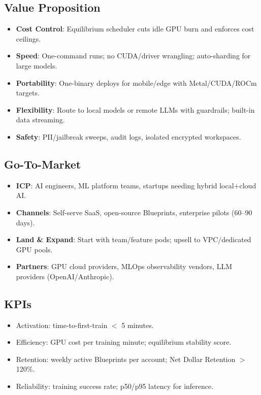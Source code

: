 \documentclass[11pt]{article}
\begin{document}
\subsection{Value Proposition}
\begin{itemize}
  \item \textbf{Cost Control}: Equilibrium scheduler cuts idle GPU burn and enforces cost ceilings.
  \item \textbf{Speed}: One-command runs; no CUDA/driver wrangling; auto-sharding for large models.
  \item \textbf{Portability}: One-binary deploys for mobile/edge with Metal/CUDA/ROCm targets.
  \item \textbf{Flexibility}: Route to local models or remote LLMs with guardrails; built-in data streaming.
  \item \textbf{Safety}: PII/jailbreak sweeps, audit logs, isolated encrypted workspaces.
\end{itemize}

\subsection{Go-To-Market}
\begin{itemize}
  \item \textbf{ICP}: AI engineers, ML platform teams, startups needing hybrid local+cloud AI.
  \item \textbf{Channels}: Self-serve SaaS, open-source Blueprints, enterprise pilots (60--90 days).
  \item \textbf{Land \& Expand}: Start with team/feature pods; upsell to VPC/dedicated GPU pools.
  \item \textbf{Partners}: GPU cloud providers, MLOps observability vendors, LLM providers (OpenAI/Anthropic).
\end{itemize}

\subsection{KPIs}
\begin{itemize}
  \item Activation: time-to-first-train $<$ 5 minutes.
  \item Efficiency: GPU cost per training minute; equilibrium stability score.
  \item Retention: weekly active Blueprints per account; Net Dollar Retention $>$120\%.
  \item Reliability: training success rate; p50/p95 latency for inference.
\end{itemize}
\end{document}
